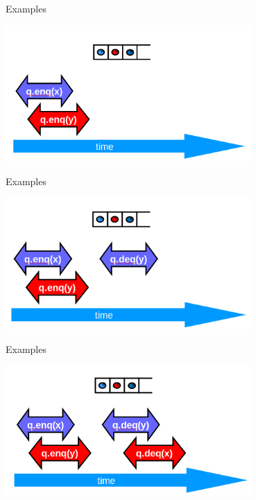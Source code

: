 \begin{frame}{Examples}
\begin{center} \includegraphics[width=0.7\textwidth]{./pics/linear/77.png} \end{center}
\end{frame}

\begin{frame}{Examples}
\begin{center} \includegraphics[width=0.7\textwidth]{./pics/linear/78.png} \end{center}
\end{frame}

\begin{frame}{Examples}
\begin{center} \includegraphics[width=0.7\textwidth]{./pics/linear/79.png} \end{center}
\end{frame}


